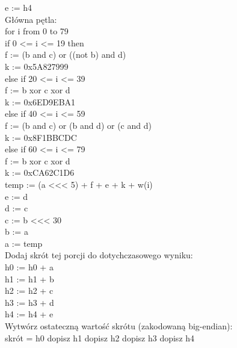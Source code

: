 \documentclass[oneside]{mgr}
\begin{document}
\hspace*{10mm}e := h4\\
\hspace*{10mm}Główna pętla:\\
\hspace*{10mm}for i from 0 to 79\\
\hspace*{20mm}if 0 <= i <= 19 then\\
\hspace*{30mm}f := (b and c) or ((not b) and d)\\
\hspace*{30mm}k := 0x5A827999\\
\hspace*{20mm}else if 20 <= i <= 39\\
\hspace*{30mm}f := b xor c xor d\\
\hspace*{30mm}k := 0x6ED9EBA1\\
\hspace*{20mm}else if 40 <= i <= 59\\
\hspace*{30mm}f := (b and c) or (b and d) or (c and d)\\
\hspace*{30mm}k := 0x8F1BBCDC\\
\hspace*{20mm}else if 60 <= i <= 79\\
\hspace*{30mm}f := b xor c xor d\\
\hspace*{30mm}k := 0xCA62C1D6\\
\hspace*{20mm}temp := (a <<< 5) + f + e + k + w(i)\\
\hspace*{20mm}e := d\\
\hspace*{20mm}d := c\\
\hspace*{20mm}c := b <<< 30\\
\hspace*{20mm}b := a\\
\hspace*{20mm}a := temp\\
\hspace*{10mm}Dodaj skrót tej porcji do dotychczasowego wyniku:\\
\hspace*{20mm}h0 := h0 + a\\
\hspace*{20mm}h1 := h1 + b\\
\hspace*{20mm}h2 := h2 + c\\
\hspace*{20mm}h3 := h3 + d\\
\hspace*{20mm}h4 := h4 + e\\
Wytwórz ostateczną wartość skrótu (zakodowaną big-endian):\\
\hspace*{10mm}skrót = h0 dopisz h1 dopisz h2 dopisz h3 dopisz h4
\end{document}
